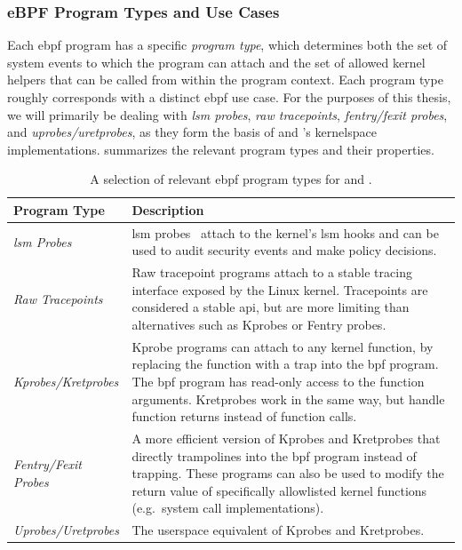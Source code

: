 \subsubsection*{eBPF Program Types and Use Cases}

Each \gls{ebpf} program has a specific \textit{program type}, which determines both the set of
system events to which the program can attach and the set of allowed kernel helpers that
can be called from within the program context. Each program type roughly corresponds with
a distinct \gls{ebpf} use case. For the purposes of this thesis, we will primarily be dealing
with \textit{\gls{lsm} probes}, \textit{raw tracepoints}, \textit{fentry/fexit probes}, and
\textit{uprobes/uretprobes}, as they form the basis of \bpfbox{} and \bpfcontain{}'s
kernelspace implementations.  summarizes the relevant program types
and their properties.

\begingroup\footnotesize
\begin{longtable}[c]{lp{4.2in}}
\caption[A selection of relevant eBPF program types for \bpfbox{} and \bpfcontain{}]{A selection of relevant \gls{ebpf} program types for \bpfbox{} and \bpfcontain{}.}%
\label{tab:program-types}\\
  \toprule
  Program Type & Description\\
  \midrule
  \textit{\gls{lsm} Probes}    & \gls{lsm} probes~\cite{singh2019_krsi} attach to the kernel's \gls{lsm} hooks and can be used to audit security events and make policy decisions.\\
  \textit{Raw Tracepoints}     & Raw tracepoint programs attach to a stable tracing interface exposed by the Linux kernel. Tracepoints are considered a stable \gls{api}, but are more limiting than alternatives such as Kprobes or Fentry probes.\\
  \textit{Kprobes/Kretprobes}  & Kprobe programs can attach to any kernel function, by replacing the function with a trap into the \gls{bpf} program. The \gls{bpf} program has read-only access to the function arguments. Kretprobes work in the same way, but handle function returns instead of function calls.\\
  \textit{Fentry/Fexit Probes} & A more efficient version of Kprobes and Kretprobes that directly trampolines into the \gls{bpf} program instead of trapping. These programs can also be used to modify the return value of specifically allowlisted kernel functions (e.g.~system call implementations).\\
  \textit{Uprobes/Uretprobes}  & The userspace equivalent of Kprobes and Kretprobes.\\
  \bottomrule
\end{longtable}
\endgroup

